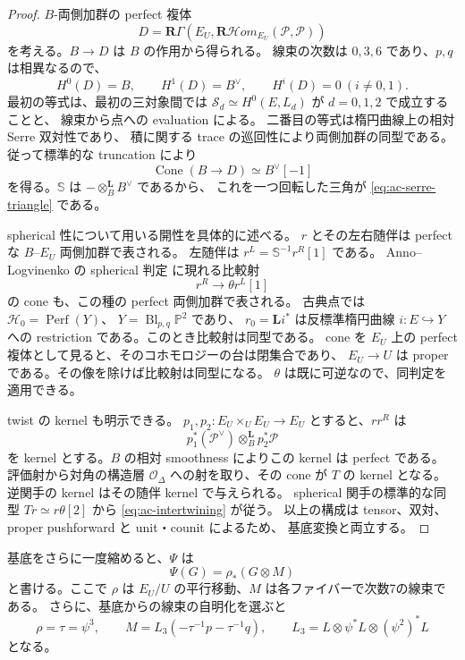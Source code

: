\begin{proof}
$B$-両側加群の perfect 複体
\[
 D=\mathbf R\Gamma(E_U,
       \mathbf R\mathcal Hom_{E_U}(\mathcal P,\mathcal P))
\]
を考える。$B\to D$ は $B$ の作用から得られる。
線束の次数は $0,3,6$ であり、$p,q$ は相異なるので、
\[
 H^0(D)=B,\qquad H^1(D)=B^\vee,
 \qquad H^i(D)=0\ (i\ne0,1).
\]
最初の等式は、最初の三対象間では
$\mathcal S_d\simeq H^0(E,L_d)$ が $d=0,1,2$ で成立することと、
線束から点への evaluation による。
二番目の等式は楕円曲線上の相対 Serre 双対性であり、
積に関する trace の巡回性により両側加群の同型である。
従って標準的な truncation により
\[
 \operatorname{Cone}(B\longrightarrow D)\simeq B^\vee[-1]
\]
を得る。$\mathbb S$ は $-\otimes_B^{\mathbf L}B^\vee$ であるから、
これを一つ回転した三角が \eqref{eq:ac-serre-triangle} である。

spherical 性について用いる開性を具体的に述べる。
$r$ とその左右随伴は perfect な $B$--$E_U$ 両側加群で表される。
左随伴は $r^L=\mathbb S^{-1}r^R[1]$ である。
Anno--Logvinenko の spherical 判定
\cite[定理1.1および定理5.1]{ACAnnoLogvinenko} に現れる比較射
\[
                  r^R\longrightarrow\theta r^L[1]
\]
の cone も、この種の perfect 両側加群で表される。
古典点では $\mathcal H_0=\operatorname{Perf}(Y)$、
$Y=\operatorname{Bl}_{p,q}\mathbb P^2$ であり、
$r_0=\mathbf L i^*$ は反標準楕円曲線 $i\colon E\hookrightarrow Y$ への restriction
である。このとき比較射は同型である。
cone を $E_U$ 上の perfect 複体として見ると、そのコホモロジーの台は閉集合であり、
$E_U\to U$ は proper である。その像を除けば比較射は同型になる。
$\theta$ は既に可逆なので、同判定を適用できる。

twist の kernel も明示できる。
$p_1,p_2\colon E_U\times_U E_U\to E_U$ とすると、$rr^R$ は
\[
 p_1^*(\mathcal P^\vee)\otimes_B^{\mathbf L}p_2^*\mathcal P
\]
を kernel とする。$B$ の相対 smoothness によりこの kernel は perfect である。
評価射から対角の構造層 $\mathcal O_\Delta$ への射を取り、その cone が $T$ の kernel
となる。逆関手の kernel はその随伴 kernel で与えられる。
spherical 関手の標準的な同型 $Tr\simeq r\theta[2]$ から
\eqref{eq:ac-intertwining} が従う。
以上の構成は tensor、双対、proper pushforward と unit・counit によるため、
基底変換と両立する。
\end{proof}

\begin{lemma}\label{lem:ac-elliptic-automorphism}
基底をさらに一度縮めると、$\Psi$ は
\[
                 \Psi(G)=\rho_*(G\otimes M)
\]
と書ける。ここで $\rho$ は $E_U/U$ の平行移動、$M$ は各ファイバーで次数7の線束である。
さらに、基底からの線束の自明化を選ぶと
\begin{equation}\label{eq:ac-elliptic-data}
 \rho=\tau=\psi^3,\qquad
 M=L_3(-\tau^{-1}p-\tau^{-1}q),\qquad
 L_3=L\otimes\psi^*L\otimes(\psi^2)^*L
\end{equation}
となる。
\end{lemma}

